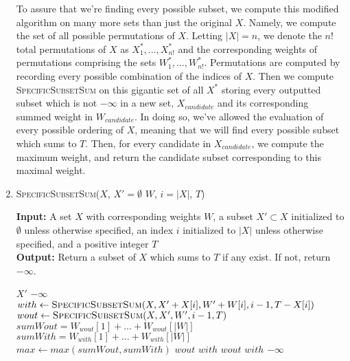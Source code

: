 \documentclass{article}
\begin{document}
\begin{enumerate}
		To assure that we're finding every possible subset, we compute this modified algorithm 
		on many more sets than just the original $X$. 
		Namely, we compute the set of all possible permutations of $X$. Letting $|X|=n$, we denote 
		the $n!$ total permutations of $X$ as $X^*_1, ... , X^*_{n!}$ and the corresponding weights 
		of permutations comprising the sets $W^*_1,...,W^*_{n!}$. Permutations are computed by recording
		every possible combination of the indices of $X$.
		Then we compute
                \textsc{SpecificSubsetSum} on this gigantic set of all $X^*$ storing every outputted subset which is
		not $-\infty$ in a new set, $X_{candidate}$ and its corresponding summed weight in $W_{candidate}$. In 
		doing so, we've allowed the evaluation of
		every possible ordering of $X$, meaning that we will find every possible subset which sums to $T$.
                Then, for every candidate in $X_{candidate}$, we compute the maximum weight, and return the candidate
                subset corresponding to this maximal weight.

	\item
		\begin{algorithm}\caption{\textsc{SpecificSubsetSum}($X$, $X'=\emptyset$ $W$, $i=|X|$, $T$)}\label{alg:sss}
                        {\bf Input:} A set $X$ with corresponding weights $W$, a subset $X' \subset X$ initialized to $\emptyset$ unless
			otherwise specified, an index $i$ initialized to $|X|$ unless otherwise specified, and a positive integer $T$\\
                        {\bf Output:} Return a subset of $X$ which sums to $T$ if any exist. If not, return $-\infty$.
                \begin{algorithmic}[1]

				\State \Return $X'$
				\State \Return $-\infty$
			\Else
				\State $with \gets \textsc{SpecificSubsetSum}(X, X' + X[i], W' + W[i], i-1, T-X[i])$
				\State $wout \gets \textsc{SpecificSubsetSum}(X, X', W', i-1, T)$
					\State $sumWout = W_{wout}[1] + ... + W_{wout}[|W|]$
					\State $sumWith = W_{with}[1] + ... + W_{with}[|W|]$
					\State $max \gets max(sumWout, sumWith)$
						\State \Return $wout$
					\Else
						\State \Return $with$
					\EndIf
					\State \Return $wout$
					\State \Return $with$
				\Else
					\State \Return $-\infty$
				\EndIf
			\EndIf


\end{algorithmic}
\end{algorithm}
\end{enumerate}
\end{document}
